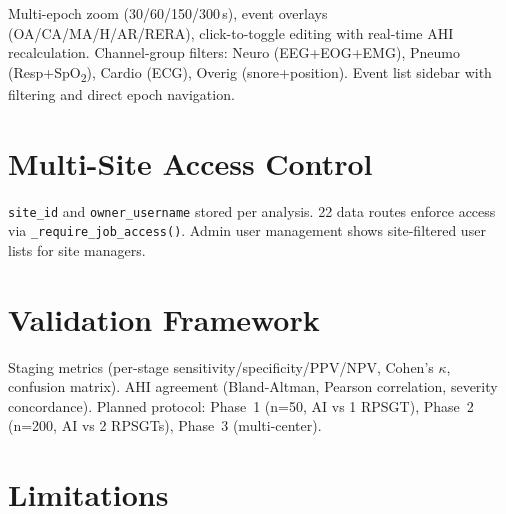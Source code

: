 \documentclass[11pt,a4paper,twocolumn]{article}
\begin{document}
Multi-epoch zoom (30/60/150/300\,s), event overlays (OA/CA/MA/H/AR/RERA), click-to-toggle editing with real-time AHI recalculation. Channel-group filters: Neuro (EEG+EOG+EMG), Pneumo (Resp+SpO\textsubscript{2}), Cardio (ECG), Overig (snore+position). Event list sidebar with filtering and direct epoch navigation.


\section{Multi-Site Access Control}

\begin{table}[H]
\centering\small
\caption{Role-based data isolation}
\end{table}

\texttt{site\_id} and \texttt{owner\_username} stored per analysis. 22 data routes enforce access via \texttt{\_require\_job\_access()}. Admin user management shows site-filtered user lists for site managers.


\section{Validation Framework}

Staging metrics (per-stage sensitivity/specificity/PPV/NPV, Cohen's $\kappa$, confusion matrix). AHI agreement (Bland-Altman, Pearson correlation, severity concordance). Planned protocol: Phase~1 (n=50, AI vs 1 RPSGT), Phase~2 (n=200, AI vs 2 RPSGTs), Phase~3 (multi-center).


\section{Limitations}
\end{document}

